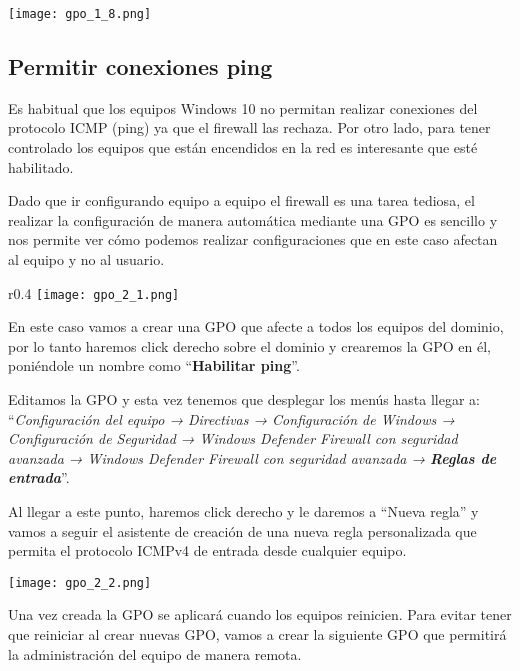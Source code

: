 \begin{center}
    \texttt{[image: gpo\_1\_8.png]}
\end{center}


\subsection{Permitir conexiones ping}

Es habitual que los equipos Windows 10 no permitan realizar conexiones del protocolo ICMP (ping) ya que el firewall las rechaza. Por otro lado, para tener controlado los equipos que están encendidos en la red es interesante que esté habilitado.

Dado que ir configurando equipo a equipo el firewall es una tarea tediosa, el realizar la configuración de manera automática mediante una GPO es sencillo y nos permite ver cómo podemos realizar configuraciones que en este caso afectan al equipo y no al usuario.

\begin{wrapfigure}{r}{0.4\linewidth}
    \centering
    \vspace{-25pt}
    \texttt{[image: gpo\_2\_1.png]}
    \vspace{-40pt}
\end{wrapfigure}

En este caso vamos a crear una GPO que afecte a todos los equipos del dominio, por lo tanto haremos click derecho sobre el dominio y crearemos la GPO en él, poniéndole un nombre como “\textbf{Habilitar ping}”.

Editamos la GPO y esta vez tenemos que desplegar los menús hasta llegar a: “\textit{Configuración del equipo → Directivas → Configuración de Windows → Configuración de Seguridad → Windows Defender Firewall con seguridad avanzada → Windows Defender Firewall con seguridad avanzada → \textbf{Reglas de entrada}}”.


Al llegar a este punto, haremos click derecho y le daremos a “Nueva regla” y vamos a seguir el asistente de creación de una nueva regla personalizada que permita el protocolo ICMPv4 de entrada desde cualquier equipo.

\begin{center}
    \texttt{[image: gpo\_2\_2.png]}
\end{center}

Una vez creada la GPO se aplicará cuando los equipos reinicien. Para evitar tener que reiniciar al crear nuevas GPO, vamos a crear la siguiente GPO que permitirá la administración del equipo de manera remota.


